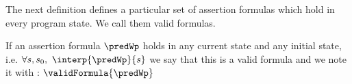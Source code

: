  

The next definition defines a particular set of assertion formulas which  hold in every program state. We call them  valid formulas. 
\begin{interpretation}\label{assertLang:interpretation:valid}
  If an assertion formula  $ \predWp $ holds in any current state and any initial state, i.e.
$\forall s, s_{0}, \  \interp{\predWp}{s} $ we say that this is a valid formula and we note it with :
  $\validFormula{\predWp} $ 
\end{interpretation}
